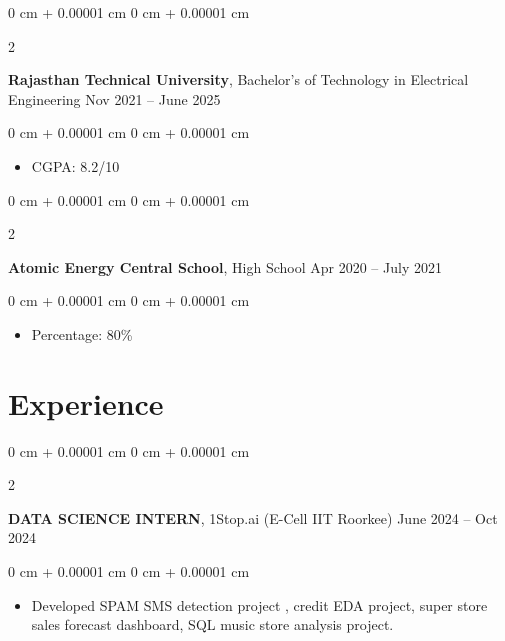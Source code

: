 \documentclass[10pt, letterpaper]{article}
\newenvironment{highlights}{
    \begin{itemize}[
        topsep=0.10 cm,
        parsep=0.10 cm,
        partopsep=0pt,
        itemsep=0pt,
        leftmargin=0 cm + 10pt
    ]
}{
    \end{itemize}
} %
\newenvironment{onecolentry}{
    \begin{adjustwidth}{
        0 cm + 0.00001 cm
    }{
        0 cm + 0.00001 cm
    }
}{
    \end{adjustwidth}
} %
\newenvironment{twocolentry}[2][]{
    \onecolentry
    \def\secondColumn{#2}
    \setcolumnwidth{\fill, 4.5 cm}
    \begin{paracol}{2}
}{
    \switchcolumn \raggedleft \secondColumn
    \end{paracol}
    \endonecolentry
} %
\begin{document}
        
        \begin{twocolentry}{
            Nov 2021 – June 2025
        }
            \textbf{Rajasthan Technical University}, Bachelor's of Technology in Electrical Engineering\end{twocolentry}

        \vspace{0.10 cm}
        \begin{onecolentry}
            \begin{highlights}
                \item CGPA: 8.2/10
            \end{highlights}
        \end{onecolentry}

\vspace{2 pt}

           \begin{twocolentry}{
            Apr 2020 – July 2021
        }
            \textbf{Atomic Energy Central School}, High School\end{twocolentry}

        \vspace{0.10 cm}
        \begin{onecolentry}
            \begin{highlights}
                \item Percentage: 80\%
            \end{highlights}
        \end{onecolentry}

\vspace{5 pt}

    
    \section{Experience}



        
        \begin{twocolentry}{
            June 2024 – Oct 2024
        }
            \textbf{DATA SCIENCE INTERN}, 1Stop.ai (E-Cell IIT Roorkee)\end{twocolentry}

        \vspace{0.10 cm}
        \begin{onecolentry}
            \begin{highlights}
                \item Developed SPAM SMS detection project , credit EDA project, super store sales forecast dashboard,
SQL music store analysis project.
            \end{highlights}
        \end{onecolentry}
        
\end{document}
